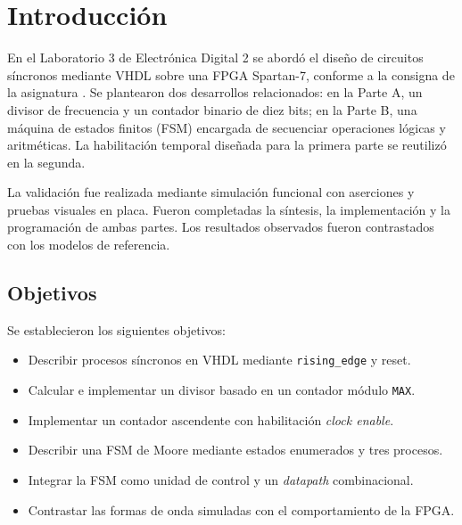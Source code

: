 \section{Introducción}
En el Laboratorio 3 de Electrónica Digital 2 se abordó el diseño de circuitos síncronos mediante VHDL sobre una FPGA Spartan-7, conforme a la consigna de la asignatura \cite{consigna}. Se plantearon dos desarrollos relacionados: en la Parte A, un divisor de frecuencia y un contador binario de diez bits; en la Parte B, una máquina de estados finitos (FSM) encargada de secuenciar operaciones lógicas y aritméticas. La habilitación temporal diseñada para la primera parte se reutilizó en la segunda.

La validación fue realizada mediante simulación funcional con aserciones y pruebas visuales en placa. Fueron completadas la síntesis, la implementación y la programación de ambas partes. Los resultados observados fueron contrastados con los modelos de referencia.

\subsection{Objetivos}
Se establecieron los siguientes objetivos:
\begin{itemize}
\item Describir procesos síncronos en VHDL mediante \texttt{rising\_edge} y reset.
\item Calcular e implementar un divisor basado en un contador módulo \texttt{MAX}.
\item Implementar un contador ascendente con habilitación \emph{clock enable}.
\item Describir una FSM de Moore mediante estados enumerados y tres procesos.
\item Integrar la FSM como unidad de control y un \emph{datapath} combinacional.
\item Contrastar las formas de onda simuladas con el comportamiento de la FPGA.
\end{itemize}

